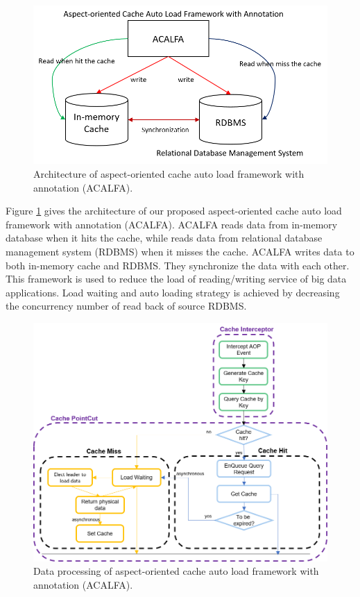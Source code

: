 \documentclass{singlecol-new}
\theoremstyle{TH}{
\newtheorem{lemma}{Lemma}
\newtheorem{theorem}[lemma]{Theorem}
\newtheorem{corrolary}[lemma]{Corrolary}
\newtheorem{conjecture}[lemma]{Conjecture}
\newtheorem{proposition}[lemma]{Proposition}
\newtheorem{claim}[lemma]{Claim}
\newtheorem{stheorem}[lemma]{Wrong Theorem}
}
\theoremstyle{THrm}{
\newtheorem{definition}{Definition}[section]
\newtheorem{question}{Question}[section]
\newtheorem{remark}{Remark}
\newtheorem{scheme}{Scheme}
}
\theoremstyle{THhit}{
\newtheorem{case}{Case}[section]
}
\begin{document}
\begin{figure} [htb]
\centering
\includegraphics[width=1.0\linewidth]{img/architecture}
\caption{\label{architecture}Architecture of aspect-oriented cache auto load framework with annotation (ACALFA).}
\end{figure}

Figure \ref{architecture} gives the architecture of our proposed aspect-oriented cache auto load framework with annotation (ACALFA). ACALFA reads data from in-memory database when it hits the cache, while reads data from relational database management system (RDBMS) when it misses the cache. ACALFA writes data to both in-memory cache and RDBMS. They synchronize the data with each other. This framework is used to reduce the load of reading/writing service of big data applications. Load waiting and auto loading strategy is achieved by decreasing the concurrency number of read back of source RDBMS.

\begin{figure} [htb]
\centering
\includegraphics[width=1.0\linewidth]{img/process}
\caption{\label{process}Data processing of aspect-oriented cache auto load framework with annotation (ACALFA).}
\end{figure}
\end{document}
